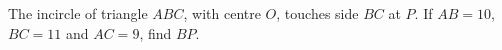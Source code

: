 The incircle of triangle $ABC$, with centre $O$, touches side $BC$ at $P$. If $AB=10$, $BC=11$ and $AC=9$, find $BP$.

